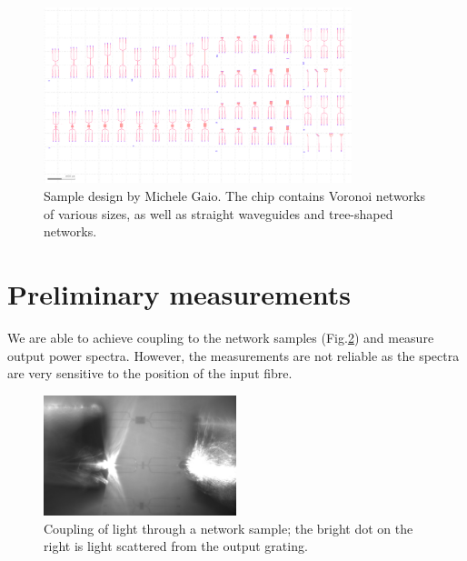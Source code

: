 \begin{figure}[hbp]
  \centering
    \includegraphics[width=0.8\textwidth]{ch4/fig4/chip_design.png}
    \caption{Sample design by Michele Gaio. The chip contains Voronoi networks of various sizes, as well as straight waveguides and tree-shaped networks.} 
    \label{fig:chip_design}
\end{figure}

\section{Preliminary measurements}
We are able to achieve coupling to the network samples (Fig.\ref{fig:coupling}) and measure output power spectra. However, the measurements are not reliable as the spectra are very sensitive to the position of the input fibre. 

\begin{figure}[h]
  \centering
    \includegraphics[width=0.5\textwidth]{ch4/fig4/785N1_coupling_top.png}    
    \caption{Coupling of light through a network sample; the bright dot on the right is light scattered from the output grating.} 
    \label{fig:coupling}
\end{figure}


